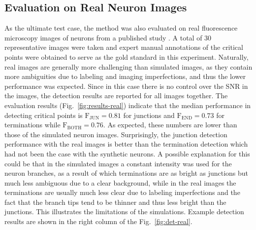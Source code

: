 \subsection{Evaluation on Real Neuron Images}
\label{subsec:experiments-real}
As the ultimate test case, the method was also evaluated on real fluorescence microscopy images of neurons from a published study \cite{steiner2002overexpression}. A total of 30 representative images were taken and expert manual annotations of the critical points were obtained to serve as the gold standard in this experiment. Naturally, real images are generally more challenging than simulated images, as they contain more ambiguities due to labeling and imaging imperfections, and thus the lower performance was expected. Since in this case there is no control over the SNR in the images, the detection results are reported for all images together. The evaluation results (Fig.~\ref{fig:results-real}) indicate that the median performance in detecting critical points is $\textrm{F}_{\textrm{JUN}}=0.81$ for junctions and $\textrm{F}_{\textrm{END}}=0.73$ for terminations while $\textrm{F}_{\textrm{BOTH}}=0.76$. As expected, these numbers are lower than those of the simulated neuron images. Surprisingly, the junction detection performance with the real images is better than the termination detection which had not been the case with the synthetic neurons. A possible explanation for this could be that in the simulated images a constant intensity was used for the neuron branches, as a result of which terminations are as bright as junctions but much less ambiguous due to a clear background, while in the real images the terminations are usually much less clear due to labeling imperfections and the fact that the branch tips tend to be thinner and thus less bright than the junctions. This illustrates the limitations of the simulations. Example detection results are shown in the right column of the Fig.~\ref{fig:det-real}.
